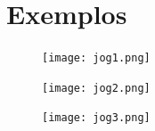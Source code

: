\documentclass[11pt,a4paper]{report}
\begin{document}
\appendix
\chapter{Exemplos}

\begin{figure}[h]
    \centering
    \texttt{[image: jog1.png]}
    \label{fig:jog1}
\end{figure}

\begin{figure}[h]
    \centering
    \texttt{[image: jog2.png]}
    \label{fig:jog2}
\end{figure}

\begin{figure}[h]
    \centering
    \texttt{[image: jog3.png]}
    \label{fig:jog3}
\end{figure}
\end{document}
